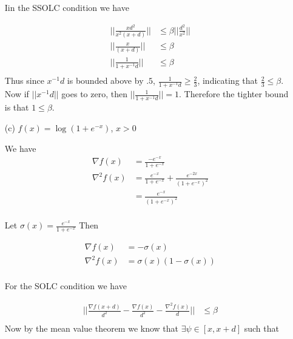 \documentclass{article} %
\begin{document}
\begin{itemize}
Iin the SSOLC condition we have

\begin{equation*}
\begin{aligned}
|| \frac{ x d^2}{x^2(x +d)} || &\leq \beta || \frac{d^2}{x^2} || \\ 
|| \frac{ x }{(x +d)} || &\leq \beta  \\ 
|| \frac{ 1}{1 + x^{-1} d} || &\leq \beta  \\ 
\end{aligned}
\end{equation*}
Thus  since $x^{-1}d$ is bounded above by $.5$,  $\frac{ 1}{1 + x^{-1} d}  \geq \frac{2}{3}$, indicating that $\frac{ 2}{3} \leq \beta$. Now if $|| x^{-1} d||$ goes to zero, then  $||\frac{ 1}{1 + x^{-1} d}||  = 1$. Therefore the tighter bound is that $  1 \leq \beta$.








\item[(c)] $f(x)=\log(1+e^{-x})$, $x> 0$


We have 
\begin{equation*}
\begin{aligned}
\nabla f(x) &= \frac{-e^{-x}}{1 + e^{-x}} \\
\nabla^2 f(x) &= \frac{e^{-x}}{1 + e^{-x}} + \frac{e^{-2x}}{ (1 + e^{-x})^2} \\ 
&= \frac{e^{-x}}{(1 + e^{-x})^2} \\ 
\end{aligned}
\end{equation*}

Let $\sigma(x) = \frac{e^{-x}}{1 + e^{-x}}$ Then 

\begin{equation*}
\begin{aligned}
\nabla f(x) &= - \sigma(x) \\
\nabla^2 f(x) &= \sigma(x) (1 - \sigma(x)) \\
\end{aligned}
\end{equation*}

For the SOLC condition we have


\begin{equation*}
\begin{aligned}
|| \frac{\nabla f(x+ d)}{d^2} - \frac{\nabla f(x)}{d^2} - \frac{\nabla^2 f(x)}{d} || &\leq \beta \\ 
\end{aligned}
\end{equation*}
Now by the mean value theorem we know that  $\exists  \psi \in [x, x + d]$ such that 


\end{itemize}
\end{document}
